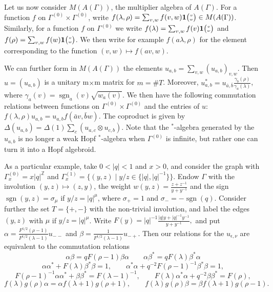 \documentclass[10pt]{article}
\DeclareMathOperator{\sgn}{\mathrm{sgn}}
\newcommand{\Z}{\mathbb{Z}}
\newcommand{\Grt}[3]{#1{\tiny {\begin{pmatrix} #2\\#3\end{pmatrix}}}}
\newcommand{\UnitC}[2]{\Grt{\mathbf{1}}{#1}{#2}}
\theoremstyle{definition}
\numberwithin{equation}{section}
\begin{document}
Let us now consider $M(A(\Gamma))$, the multiplier algebra of $A(\Gamma)$. For a function $f$ on $\Gamma^{(0)}\times \Gamma^{(0)}$, write $f(\lambda,\rho) = \sum_{v,w} f(v,w)\UnitC{v}{w} \in M(A(\Gamma))$. Similarly, for a function $f$ on $\Gamma^{(0)}$ we write $f(\lambda) = \sum_{v,w} f(v)\UnitC{v}{w}$ and $f(\rho) = \sum_{v,w}f(w)\UnitC{v}{w}$. We then write for example $f(a\lambda,\rho)$ for the element corresponding to the function $(v,w)\mapsto f(av,w)$.

We can further form in $M(A(\Gamma))$ the elements $u_{a,b} = \sum_{v,w} (u_{a,b})_{v,w}$. Then $u=(u_{a,b})$ is a unitary m$\times$m matrix for $m=\#T$. Moreover, $u_{a,b}^* =  u_{\bar{a},\bar{b}}\frac{\gamma_b(\rho)}{\gamma_a(\lambda)}$, where $\gamma_a(v) = \sgn_a(v)\sqrt{w_a(v)}$. We then have the following commutation relations between functions on $\Gamma^{(0)}\times \Gamma^{(0)}$ and the entries of $u$: $f(\lambda,\rho)u_{a,b} = u_{a,b}f(\bar{a}v,\bar{b}w)$. The coproduct is given by $\Delta(u_{a,b}) = \Delta(1) \sum_c(u_{a,c}\otimes u_{c,b})$. Note that the $^*$-algebra generated by the $u_{a,b}$ is no longer a weak Hopf $^*$-algebra when $\Gamma^{(0)}$ is infinite, but rather one can turn it into a Hopf algebroid.

As a particular example, take $0<|q|<1$ and $x>0$, and consider the graph with $\Gamma_x^{(0)} = x|q|^{\Z}$ and $\Gamma_x^{(1)} = \{(y,z)\mid y/z \in \{|q|,|q|^{-1}\}\}$. Endow $\Gamma$ with the involution $(y,z) \mapsto (z,y)$, the weight $w(y,z) = \frac{z+z^{-1}}{y+y^{-1}}$ and the sign $\sgn(y,z) = \sigma_{\mu}$ if $y/z = |q|^{\mu}$, where $\sigma_{+} = 1$ and $\sigma_- = -\sgn(q)$.  Consider further the set $T = \{+,-\}$ with the non-trivial involution, and label the edges $(y,z)$ with $\mu$ if $y/z = |q|^{\mu}$. Write $F(y) = |q|^{-1}\frac{|q|y+|q|^{-1}y^{-1}}{y+y^{-1}},$ and put $\alpha = \frac{F^{1/2}(\rho-1)}{F^{1/2}(\lambda-1)}u_{--}$ and $\beta = \frac{1}{F^{1/2}(\lambda-1)}u_{-+}.$ Then our relations for the $u_{\epsilon,\nu}$ are equivalent to the commutation relations \begin{equation}\label{EqqCom} \alpha \beta = qF(\rho-1)\beta\alpha \qquad \alpha\beta^* = qF(\lambda)\beta^*\alpha\end{equation} \begin{equation}\label{EqDet} \alpha\alpha^* +F(\lambda)\beta^*\beta = 1,\qquad \alpha^*\alpha+q^{-2}F(\rho-1)^{-1}\beta^*\beta = 1,\end{equation}\begin{equation*} F(\rho-1)^{-1}\alpha\alpha^* +\beta\beta^* = F(\lambda-1)^{-1},\qquad  F(\lambda)\alpha^*\alpha +q^{-2}\beta\beta^* = F(\rho),\end{equation*} \begin{equation}\label{EqGrad} f(\lambda)g(\rho)\alpha =
\alpha f(\lambda+1)g(\rho+1),\qquad f(\lambda)g(\rho)\beta = \beta f(\lambda+1)g(\rho-1).\end{equation}
\end{document}
